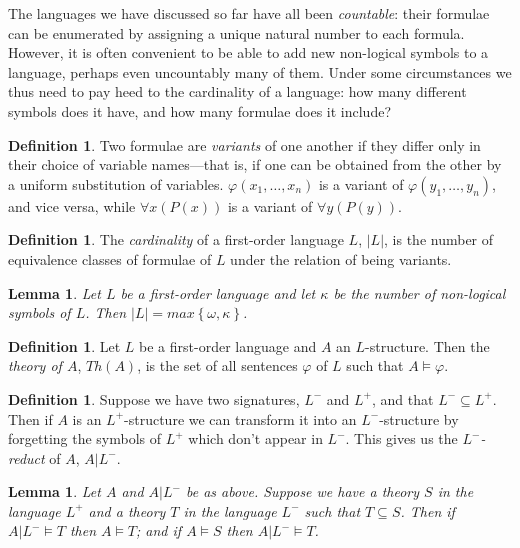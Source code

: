\documentclass[10pt, a4paper, oneside]{article}
\theoremstyle{definition}
\newtheorem{dfn}[thm]{Definition}
\theoremstyle{remark}
\theoremstyle{plain}
\newtheorem{lem}[thm]{Lemma}
\theoremstyle{plain}
\begin{document}
The languages we have discussed so far have all been \emph{countable}: their
formulae can be enumerated by assigning a unique natural number to each formula.
However, it is often convenient to be able to add new non-logical symbols to a
language, perhaps even uncountably many of them. Under some circumstances we
thus need to pay heed to the cardinality of a language: how many different
symbols does it have, and how many formulae does it include?

\begin{dfn}
    Two formulae are \emph{variants} of one another if they differ only in their
    choice of variable names---that is, if one can be obtained from the other by
    a uniform substitution of variables. $\varphi(x_1, \dotsc, x_n)$ is a
    variant of $\varphi(y_1, \dotsc, y_n)$, and vice versa, while
    $\forall{x} (P(x))$ is a variant of $\forall{y} (P(y))$.
\end{dfn}

\begin{dfn}
    The \emph{cardinality} of a first-order language $L$, $|L|$, is the number
    of equivalence classes of formulae of $L$ under the relation of being
    variants.
\end{dfn}

\begin{lem}
    \label{lem:lang_card}
    Let $L$ be a first-order language and let $\kappa$ be the number of
    non-logical symbols of $L$. Then $|L| = max \left\{ \omega, \kappa \right\}$.
\end{lem}

\begin{dfn}
    Let $L$ be a first-order language and $A$ an $L$-structure. Then the
    \emph{theory of $A$}, $Th(A)$, is the set of all sentences $\varphi$ of $L$
    such that $A \models \varphi$.
\end{dfn}

\begin{dfn}
    Suppose we have two signatures, $L^-$ and $L^+$, and that $L^- \subseteq
    L^+$. Then if $A$ is an $L^+$-structure we can transform it into an
    $L^-$-structure by forgetting the symbols of $L^+$ which don't appear in
    $L^-$. This gives us the \emph{$L^-$-reduct} of $A$, $A|L^-$.
\end{dfn}

\begin{lem}
    \label{lem:reducts}
    Let $A$ and $A| L^-$ be as above. Suppose we have a theory $S$ in the
    language $L^+$ and a theory $T$ in the language $L^-$ such that
    $T \subseteq S$. Then if $A|L^- \models T$ then $A \models T$; and if
    $A \models S$ then $A| L^- \models T$.
\end{lem}
\end{document}

